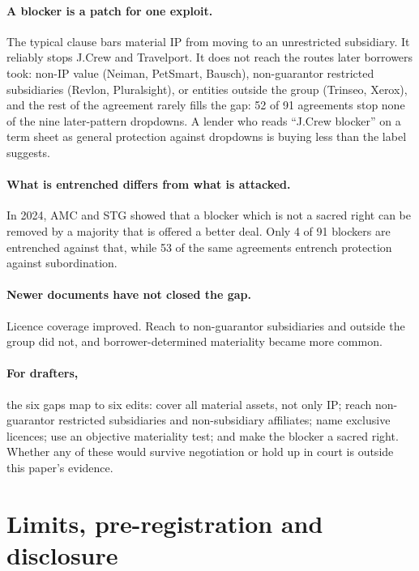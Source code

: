 \documentclass[12pt]{article}
\begin{document}
\paragraph{A blocker is a patch for one exploit.} The typical clause bars material IP from moving to an unrestricted subsidiary. It reliably stops J.Crew and Travelport. It does not reach the routes later borrowers took: non-IP value (Neiman, PetSmart, Bausch), non-guarantor restricted subsidiaries (Revlon, Pluralsight), or entities outside the group (Trinseo, Xerox), and the rest of the agreement rarely fills the gap: 52 of 91 agreements stop none of the nine later-pattern dropdowns. A lender who reads ``J.Crew blocker'' on a term sheet as general protection against dropdowns is buying less than the label suggests.

\paragraph{What is entrenched differs from what is attacked.} In 2024, AMC and STG showed that a blocker which is not a sacred right can be removed by a majority that is offered a better deal. Only 4 of 91 blockers are entrenched against that, while 53 of the same agreements entrench protection against subordination.

\paragraph{Newer documents have not closed the gap.} Licence coverage improved. Reach to non-guarantor subsidiaries and outside the group did not, and borrower-determined materiality became more common.

\paragraph{For drafters,} the six gaps map to six edits: cover all material assets, not only IP; reach non-guarantor restricted subsidiaries and non-subsidiary affiliates; name exclusive licences; use an objective materiality test; and make the blocker a sacred right. Whether any of these would survive negotiation or hold up in court is outside this paper's evidence.

\section{Limits, pre-registration and disclosure}\label{sec:limits}
\end{document}
